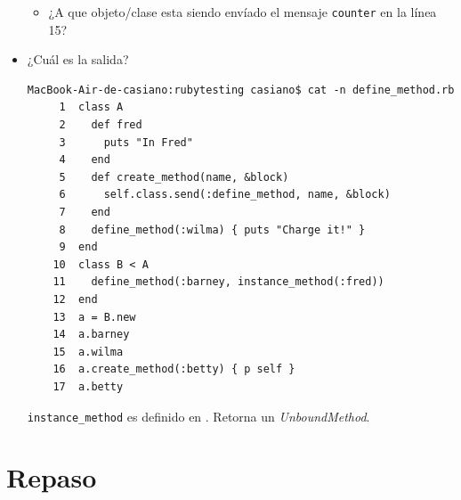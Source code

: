 \begin{itemize}
\begin{itemize}
\item
¿A que objeto/clase  esta siendo envíado el mensaje \verb|counter| en la línea 15?
\end{itemize}
\item
¿Cuál es la salida?
\begin{verbatim}
MacBook-Air-de-casiano:rubytesting casiano$ cat -n define_method.rb 
     1  class A
     2    def fred
     3      puts "In Fred"
     4    end
     5    def create_method(name, &block)
     6      self.class.send(:define_method, name, &block)
     7    end
     8    define_method(:wilma) { puts "Charge it!" }
     9  end
    10  class B < A
    11    define_method(:barney, instance_method(:fred))
    12  end
    13  a = B.new
    14  a.barney
    15  a.wilma
    16  a.create_method(:betty) { p self }
    17  a.betty
\end{verbatim}
\verb|instance_method| es definido en .
Retorna un {\it UnboundMethod}.
\end{itemize}

\section{Repaso}

